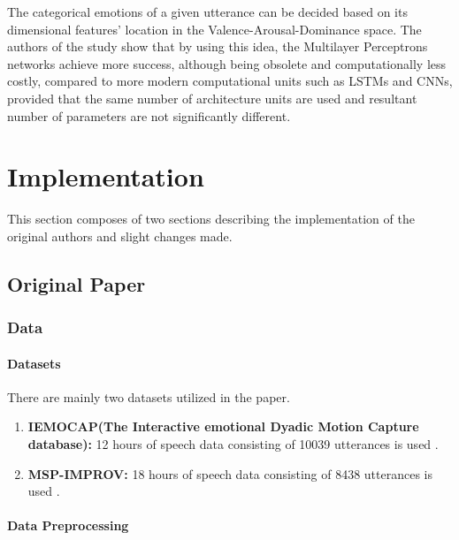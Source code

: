 \documentclass[a4paper,11pt]{article}
\begin{document}
The categorical emotions of a given utterance can be decided based on its dimensional features' location in the Valence-Arousal-Dominance space. The authors of the study show that by using this idea, the Multilayer Perceptrons networks achieve more success, although being obsolete and computationally less costly, compared to more modern computational units such as LSTMs and CNNs, provided that the same number of architecture units are used and resultant number of parameters are not significantly different.

\pagebreak

\section{Implementation} \label{sec:implementation}

This section composes of two sections describing the implementation of the original authors and slight changes made.

\subsection{Original Paper}
\subsubsection{Data} 

\paragraph{Datasets}

There are mainly two datasets utilized in the paper. 
\begin{enumerate}
    \item \textbf{IEMOCAP(The Interactive emotional Dyadic Motion Capture database):} 12 hours of speech data consisting of 10039 utterances  is used \cite{busso2008iemocap}.
    \item \textbf{MSP-IMPROV:} 18 hours of speech data consisting of 8438 utterances is used \cite{busso2016msp}.
\end{enumerate}

\paragraph{Data Preprocessing} \label{subsec:datapreprocess}
\end{document}
